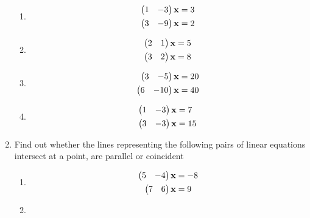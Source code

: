 \documentclass[journal,12pt,twocolumn]{IEEEtran}
\renewcommand\thesection{\arabic{section}}
\begin{document}
\begin{enumerate}[label=\thesection.\arabic*.,ref=\thesection.\theenumi]
\begin{enumerate}[itemsep=2pt]
\item
\begin{align}
\begin{split}
\begin{pmatrix}1 & -3 \end{pmatrix}\mathbf{x}&=3
\\
\begin{pmatrix}3 & -9 \end{pmatrix}\mathbf{x}&=2
\end{split}
\label{linform/11/ab/1.0.1}
\end{align}
\item
\begin{align}
\begin{split}
\begin{pmatrix}2 & 1 \end{pmatrix}\mathbf{x}&=5
\\
\begin{pmatrix}3 & 2 \end{pmatrix}\mathbf{x}&=8
\end{split}
\label{linform/11/ab/1.0.2}
\end{align}
\item
\begin{align}
\begin{split}
\begin{pmatrix}3 & -5 \end{pmatrix}\mathbf{x}&=20
\\
\begin{pmatrix}6 & -10 \end{pmatrix}\mathbf{x}&=40
\end{split}
\end{align}
\item
\begin{align}
\begin{split}
\begin{pmatrix}1 & -3 \end{pmatrix}\mathbf{x}&=7
\\
\begin{pmatrix}3 & -3 \end{pmatrix}\mathbf{x}&=15
\end{split}
\end{align}
\end{enumerate}
%
\solution
%    
%
%
%
\item Find out whether the lines representing the
following pairs of linear equations intersect at a point, are parallel or coincident
%
\begin{enumerate}[itemsep=2pt]
\item
\begin{align}
\begin{split}
\begin{pmatrix}5 & -4 \end{pmatrix}\mathbf{x}&=-8
\\
\begin{pmatrix}7 & 6 \end{pmatrix}\mathbf{x}&=9
\end{split}
\label{line/6/1.0.1}
\end{align}
\item
\begin{align}

\end{align}
\end{enumerate}
\end{enumerate}
\end{document}
